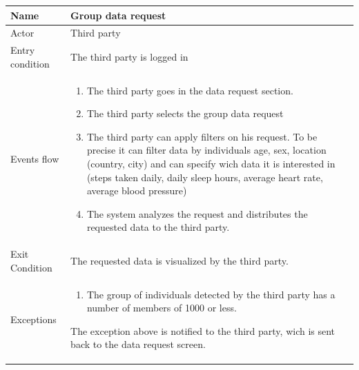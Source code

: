 \begin{tabular}{|l|p{11cm}|}
    \hline
    Name & Group data request
    \\ \hline
    Actor & Third party
    \\ \hline 
    Entry condition & The third party is logged in
        \\ \hline
    Events flow &
    \begin{enumerate}
    \item The third party goes in the data request section.
    \item The third party selects the group data request
	\item The third party can apply filters on his request. To be precise it can filter data by individuals age, sex, location (country, city) and can specify wich data it is interested in (steps taken daily, daily sleep hours, average heart rate, average blood pressure)
	\item The system analyzes the request and distributes the requested data to the third party.
    \end{enumerate}
     \\ \hline
     Exit Condition & The requested data is visualized by the third party.
     \\
    \hline
    Exceptions &
        \begin{enumerate}
    \item The group of individuals detected by the third party has a number of members of 1000 or less.     
    \end{enumerate}
      The exception above is notified to the third party, wich is sent back to the data request screen.
	 \\
    \hline
\end{tabular}


  

